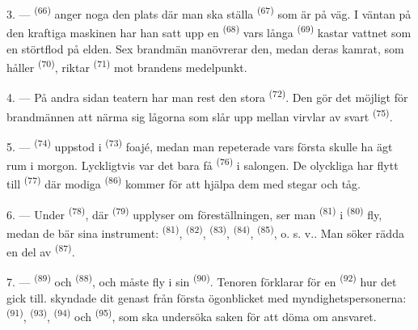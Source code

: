 3. ---  \textsuperscript{(66)} anger noga den plats där man ska ställa
 \textsuperscript{(67)} som är på väg. I väntan på den kraftiga maskinen
har han satt upp en  \textsuperscript{(68)} vars långa 
\textsuperscript{(69)} kastar vattnet som en störtflod på elden. Sex brandmän manövrerar den,
medan deras kamrat, som håller  \textsuperscript{(70)}, riktar
 \textsuperscript{(71)} mot brandens medelpunkt.

4. --- På andra sidan teatern har man rest den stora  \textsuperscript{(72)}.
Den gör det möjligt för brandmännen att närma sig lågorna som slår upp mellan virvlar av svart
 \textsuperscript{(75)}.

\VUsaut{5.0mm}
\VUsaut{3.4mm}

5. ---  \textsuperscript{(74)} uppstod i 
\textsuperscript{(73)} foajé, medan man repeterade  vars första
 skulle ha ägt rum i morgon. Lyckligtvis var det bara få
 \textsuperscript{(76)} i salongen. De olyckliga har flytt till
 \textsuperscript{(77)} där modiga 
\textsuperscript{(86)} kommer för att hjälpa dem med stegar och tåg.

6. --- Under  \textsuperscript{(78)}, där 
\textsuperscript{(79)} upplyser om föreställningen, ser man 
\textsuperscript{(81)} i  \textsuperscript{(80)} fly, medan de bär sina
instrument:  \textsuperscript{(81)},  \textsuperscript{(82)},
 \textsuperscript{(83)},
 \textsuperscript{(84)}, 
\textsuperscript{(85)}, o. s. v.. Man söker rädda en del av 
\textsuperscript{(87)}.

7. ---  \textsuperscript{(89)} och
 \textsuperscript{(88)},  och
 måste fly i sin 
\textsuperscript{(90)}. Tenoren förklarar för en  \textsuperscript{(92)}
hur det gick till.  skyndade dit genast från första ögonblicket med
myndighetspersonerna:  \textsuperscript{(91)}, 
\textsuperscript{(93)},
 \textsuperscript{(94)} och  \textsuperscript{(95)}, som ska undersöka saken för att döma om ansvaret.
\VUsaut{6.0mm}
\VUfilet{22mm}
